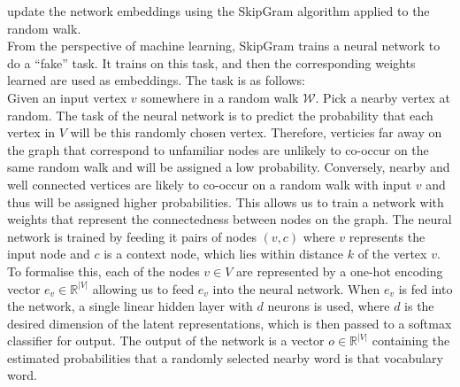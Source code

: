 \documentclass[a4paper]{article}
\begin{document}
update the network embeddings using the SkipGram algorithm applied to the random
walk.\\
From the perspective of machine learning, SkipGram trains a neural network to do
a ``fake'' task. It trains on this task, and then the corresponding weights
learned are used as embeddings. The task is as follows:\\
Given an input vertex $v$ somewhere in a random walk $\mathcal{W}$. Pick a
nearby vertex at random. The task of the neural network is to
predict the probability that each vertex in $V$ will be this randomly chosen
vertex. Therefore, verticies far away on the graph that correspond to unfamiliar
nodes are unlikely to co-occur on the same random walk and will be assigned a
low probability. Conversely, nearby and well connected vertices are likely to
co-occur on a random walk with input $v$ and thus will be assigned higher
probabilities. This allows us to train a network with weights that represent the
connectedness between nodes on the graph. The neural network is trained by
feeding it pairs of nodes $(v, c)$ where $v$ represents the input node and $c$
is a context node, which lies within distance $k$ of the vertex $v$.\\ 

To formalise this, each of the nodes $v \in V$ are represented by a one-hot
encoding vector $e_v \in \mathbb{R}^{|V|}$ allowing us to feed $e_v$ into the
neural network. When $e_v$ is fed into the network, a single linear hidden layer with
$d$ neurons is used, where $d$ is the desired dimension of the latent
representations, which is then passed to a softmax classifier for output. The
output of the network is a vector $o \in \mathbb{R}^{|V|}$ containing the estimated
probabilities that a randomly selected nearby word is that vocabulary word.
\end{document}
